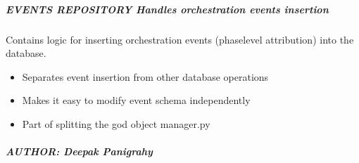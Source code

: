 \documentclass[letterpaper,10pt,english]{sphinxmanual}
\begin{document}
\subparagraph{EVENTS REPOSITORY \textendash{} Handles orchestration events insertion}
\label{\detokenize{core.database.repositories.events:events-repository-handles-orchestration-events-insertion}}\begin{description}
\sphinxAtStartPar
Contains logic for inserting orchestration events (phase\sphinxhyphen{}level attribution)
into the database.

\begin{itemize}
\item {} 
\sphinxAtStartPar
Separates event insertion from other database operations

\item {} 
\sphinxAtStartPar
Makes it easy to modify event schema independently

\item {} 
\sphinxAtStartPar
Part of splitting the god object manager.py

\end{itemize}

\end{description}


\subparagraph{AUTHOR: Deepak Panigrahy}
\label{\detokenize{core.database.repositories.events:author-deepak-panigrahy}}
\end{document}
